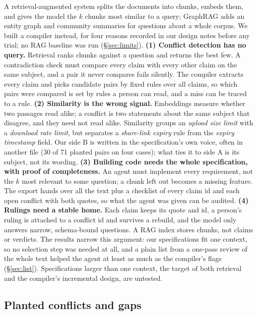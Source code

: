 \documentclass{article}
\begin{document}
A retrieval-augmented system \citep{lewis2020rag} splits the documents into chunks,
embeds them, and gives the model the $k$ chunks most similar to a query; GraphRAG
\citep{edge2024graphrag} adds an entity graph and community summaries for questions about a whole corpus.
We built a compiler instead, for four reasons recorded in our design notes before any trial; no RAG
baseline was run (\S\ref{sec:limits}).
\textbf{(1) Conflict detection has no query.} Retrieval ranks chunks against a question and returns the
best few. A contradiction check must compare every claim with every other claim on the same subject, and
a pair it never compares fails silently. The compiler extracts every claim and picks candidate pairs by
fixed rules over all claims, so which pairs were compared is set by rules a person can read, and a miss
can be traced to a rule.
\textbf{(2) Similarity is the wrong signal.} Embeddings measure whether two passages read alike; a conflict
is two statements about the same subject that disagree, and they need not read alike. Similarity groups an
\emph{upload size limit} with a \emph{download rate limit}, but separates a \emph{share-link expiry} rule
from the \emph{expiry timestamp} field. Our side B is written in the specification's own voice, often in
another file (30 of 71 planted pairs on four cases); what ties it to side A is its subject, not its
wording.
\textbf{(3) Building code needs the whole specification, with proof of completeness.} An agent must
implement every requirement, not the $k$ most relevant to some question; a chunk left out becomes a missing
feature. The export hands over all the text plus a checklist of every claim id and each open conflict
with both quotes, so what the agent was given can be audited.
\textbf{(4) Rulings need a stable home.} Each claim keeps its quote and id, a person's ruling is attached
to a conflict id and survives a rebuild, and the model only answers narrow, schema-bound questions. A RAG
index stores chunks, not claims or verdicts.
The results narrow this argument: our specifications fit one context, so no selection step was needed at
all, and a plain list from a one-pass review of the whole text helped the agent at least as much as
the compiler's flags (\S\ref{sec:list}). Specifications larger than one context, the target of both retrieval and the
compiler's incremental design, are untested.

\subsection{Planted conflicts and gaps}\label{sec:planted}
\end{document}
